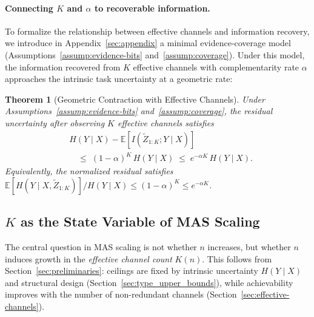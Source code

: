 \documentclass{article}
\theoremstyle{plain}
\newtheorem{theorem}{Theorem}[section]
\theoremstyle{definition}
\theoremstyle{remark}
\newcommand{\EE}{\mathbb{E}}
\begin{document}
\paragraph{Connecting $K$ and $\alpha$ to recoverable information.}
To formalize the relationship between effective channels and information recovery, we introduce in Appendix~\ref{sec:appendix} a minimal evidence-coverage model (Assumptions~\ref{assump:evidence-bits} and~\ref{assump:coverage}). Under this model, the information recovered from $K$ effective channels with complementarity rate $\alpha$ approaches the intrinsic task uncertainty at a geometric rate:
\begin{theorem}[Geometric Contraction with Effective Channels]
\label{thm:lb_saturated}
Under Assumptions~\ref{assump:evidence-bits} and~\ref{assump:coverage}, the residual uncertainty after observing $K$ effective channels satisfies
\begin{equation}
\boxed{
\begin{aligned}
&H(Y\mid X) - \EE\!\left[I(\tilde Z_{1:K};Y\mid X)\right] \\
&\quad\le\; (1-\alpha)^K \, H(Y\mid X)
\;\le\; e^{-\alpha K} \, H(Y\mid X).
\end{aligned}
}
\label{eq:lower_bound_main}
\end{equation}
Equivalently, the \emph{normalized residual} satisfies
$\EE[H(Y\mid X,\tilde Z_{1:K})]/H(Y\mid X)\le (1-\alpha)^K \le e^{-\alpha K}$.
\end{theorem}


\subsection{$K$ as the State Variable of MAS Scaling}
\label{sec:K_state_variable}

The central question in MAS scaling is not whether $n$ increases, but whether $n$ induces growth in the \emph{effective channel count} $K(n)$.
This follows from Section~\ref{sec:preliminaries}: ceilings are fixed by intrinsic uncertainty $H(Y\mid X)$ and structural design (Section~\ref{sec:type_upper_bounds}), while achievability improves with the number of non-redundant channels (Section~\ref{sec:effective-channels}).
\vspace{-0.2cm}
\end{document}
